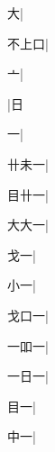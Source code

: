 \begin{multicols}{2}
{{\cjk{}{\cnsym{}　}{\cnsym{}　}大}|{}\par
{\cjk{}不上口}|{}\par
{亠}|{}\par
\null\par
{\cjk{}{\cnsym{}　}{\cnsym{}　}{\cnsym{}　}}\mktsJzrVerticalBar{}{\cjk{}{\cnsym{}　}{\cnsym{}　}{\cnsym{}　}}|{\cjk{}日}\par
{\cjk{}{\cnsym{}　}{\cnsym{}　}一}\mktsJzrVerticalBar{}{\cjk{}{\cnsym{}　}{\cnsym{}　}{\cnsym{}　}}|{}\par
{\cjk{}卄未一}|{}\par
{\cjk{}目卄一}\mktsJzrVerticalBar{}{\cjk{}{\cnsym{}　}{\cnsym{}　}{\cnsym{}　}}|{}\par
{\cjk{}大大一}|{}\par
{\cjk{}{\cnsym{}　}戈一}\mktsJzrVerticalBar{}{\cjk{}{\cnsym{}　}{\cnsym{}　}{\cnsym{}　}}|{}\par
{\cjk{}{\cnsym{}　}小一}\mktsJzrVerticalBar{}{\cjk{}{\cnsym{}　}{\cnsym{}　}{\cnsym{}　}}|{}\par
{\cjk{}戈口一}\mktsJzrVerticalBar{}{\cjk{}{\cnsym{}　}{\cnsym{}　}{\cnsym{}　}}|{}\par
{\cjk{}一吅一}\mktsJzrVerticalBar{}{\cjk{}{\cnsym{}　}{\cnsym{}　}{\cnsym{}　}}|{}\par
{\cjk{}一日一}|{}\par
{\cjk{}{\cnsym{}　}目一}\mktsJzrVerticalBar{}{\cjk{}{\cnsym{}　}{\cnsym{}　}{\cnsym{}　}}|{}\par
{\cjk{}{\cnsym{}　}中一}\mktsJzrVerticalBar{}{\cjk{}{\cnsym{}　}{\cnsym{}　}{\cnsym{}　}}|{}\par
}
\end{multicols}
